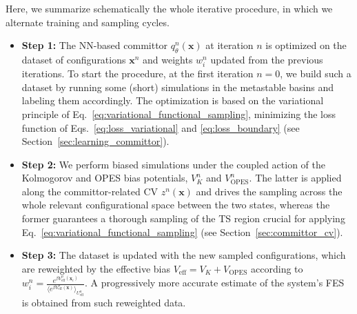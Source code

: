         Here, we summarize schematically the whole iterative procedure, in which we alternate training and sampling cycles.
            \begin{itemize}
                \item \textbf{Step 1:} The NN-based committor   $q_\theta^n(\textbf{x})$ at iteration $n$ is optimized on the dataset of configurations $\mathbf{x}^{n}$ and weights $w_i^{n}$ updated from the previous iterations. 
                To start the procedure, at the first iteration $n=0$, we build such a dataset by running some (short) simulations in the metastable basins and labeling them accordingly.
                The optimization is based on the variational principle of Eq.~\ref{eq:variational_functional_sampling}, minimizing the loss function of Eqs.~\ref{eq:loss_variational} and \ref{eq:loss_boundary} (see Section~\ref{sec:learning_committor}).
                
                \item \textbf{Step 2:} We perform biased simulations under the coupled action of the Kolmogorov and OPES bias potentials, $V^n_K$ and $V^n_{\text{OPES}}$.
                The latter is applied along the committor-related CV $z^n(\textbf{x})$ and drives the sampling across the whole relevant configurational space between the two states, whereas the former guarantees a thorough sampling of the TS region crucial for applying Eq.~\ref{eq:variational_functional_sampling} (see Section~\ref{sec:committor_cv}).
                
            \item \textbf{Step 3:} The dataset is updated with the new sampled configurations, which are reweighted by the effective bias $V_{\text{eff}} = V_K + V_{\text{OPES}}$ according to $w^n_i = \frac{e^{\beta V_{\text{eff}}^n(\textbf{x}_i)}}{\langle e^{\beta V_{\text{eff}}^n(\textbf{x})} \rangle_{U^n_{\text{eff}}} }$. 
                A progressively more accurate estimate of the system's FES is obtained from such reweighted data. 
            \end{itemize}         


    
